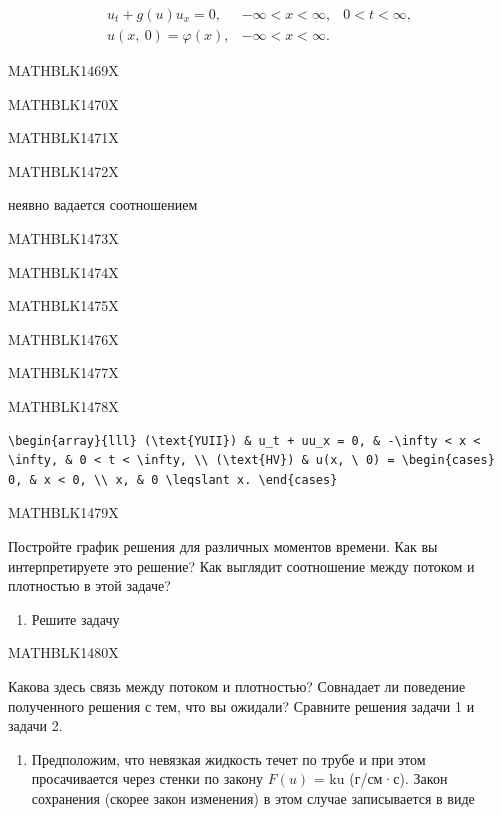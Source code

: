 \documentclass[
  ukrainian,
]{article}
\providecommand{\tightlist}{%
  \setlength{\itemsep}{0pt}\setlength{\parskip}{0pt}}
\begin{document}
\[
\begin{array}{ll} u_t + g\left(u\right) u_x = 0, & -\infty < x < \infty, & 0 < t < \infty, \\ u\left(x, \ 0\right) = \varphi\left(x\right), & -\infty < x < \infty. \end{array}
\]

MATHBLK1469X

MATHBLK1470X

MATHBLK1471X

MATHBLK1472X

неявно вадается соотношением

MATHBLK1473X

MATHBLK1474X

MATHBLK1475X

MATHBLK1476X

MATHBLK1477X

MATHBLK1478X

\begin{verbatim}
\begin{array}{lll} (\text{YUII}) & u_t + uu_x = 0, & -\infty < x < \infty, & 0 < t < \infty, \\ (\text{HV}) & u(x, \ 0) = \begin{cases} 0, & x < 0, \\ x, & 0 \leqslant x. \end{cases}
\end{verbatim}

MATHBLK1479X

Постройте график решения для различных моментов времени. Как вы
интерпретируете это решение? Как выглядит соотношение между потоком и
плотностью в этой задаче?

\begin{enumerate}
\def\labelenumi{\arabic{enumi}.}
\setcounter{enumi}{1}
\tightlist
\item
  Решите задачу
\end{enumerate}

MATHBLK1480X

Какова здесь связь между потоком и плотностью? Совнадает ли поведение
полученного решения с тем, что вы ожидали? Сравните решения задачи 1 и
задачи 2.

\begin{enumerate}
\def\labelenumi{\arabic{enumi}.}
\setcounter{enumi}{2}
\tightlist
\item
  Предположим, что невязкая жидкость течет по трубе и при этом
  просачивается через стенки по закону \(F(u)\) = ku (г/см·с). Закон
  сохранения (скорее закон изменения) в этом случае записывается в виде
\end{enumerate}
\end{document}
